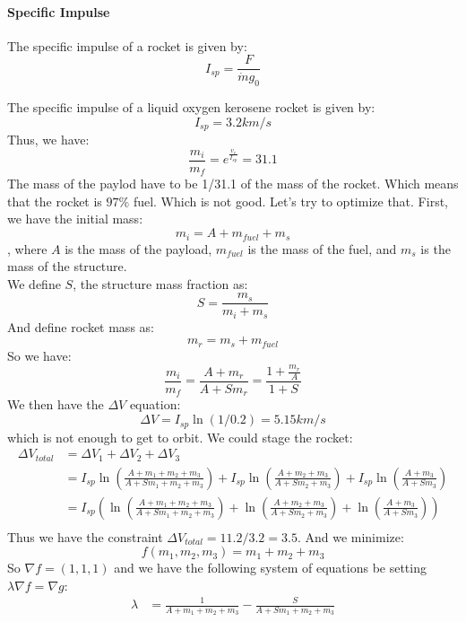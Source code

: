 \documentclass[11pt]{report}
\begin{document}
\paragraph{Specific Impulse} The specific impulse of a rocket is given by:
\begin{equation}
    I_{sp} = \frac{F}{\dot{m}g_0}
\end{equation}
\begin{example}
    The specific impulse of a liquid oxygen kerosene rocket is given by:
    $$
        I_{sp} = 3.2 km/s
    $$
    Thus, we have:
    $$
    \frac{m_i}{m_f} = e^{\frac{v_e}{I_{sp}}} = 31.1
    $$
    The mass of the paylod have to be 1/31.1 of the mass of the rocket. Which means that the rocket is $97\%$ fuel. Which is not good. Let's try to optimize that. First, we have the initial mass:
    $$
    m_i = A + m_{fuel} + m_s
    $$
    , where $A$ is the mass of the payload, $m_{fuel}$ is the mass of the fuel, and $m_s$ is the mass of the structure.\\
    We define $S$, the structure mass fraction as:
    $$
    S = \frac{m_s}{m_i + m_s}
    $$
    And define rocket mass as:
    $$
    m_r = m_s + m_{fuel}
    $$
    So we have:
    $$
        \frac{m_i}{m_f} = \frac{A + m_r}{A + Sm_r} = \frac{1 + \frac{m_r}{A}}{1 + S}
    $$
    We then have the $\Delta V$ equation:
    $$
    \Delta V = I_{sp} \ln(1/0.2) = 5.15 km/s
    $$
    which is not enough to get to orbit. We could stage the rocket:
    \begin{align*}
        \Delta V_{total} &= \Delta V_1 + \Delta V_2 + \Delta V_3 \\
        &= I_{sp} \ln \left( \frac{A + m_1 + m_2 + m_3}{A + Sm_1 + m_2 + m_3} \right) + I_{sp} \ln \left( \frac{A + m_2 + m_3}{A + Sm_2 + m_3} \right) + I_{sp} \ln \left( \frac{A + m_3}{A + Sm_3} \right) \\
        &= I_{sp} (\ln \left( \frac{A + m_1 + m_2 + m_3}{A + Sm_1 + m_2 + m_3} \right) + \ln \left( \frac{A + m_2 + m_3}{A + Sm_2 + m_3} \right) + \ln \left( \frac{A + m_3}{A + Sm_3} \right) ) \\
    \end{align*}
    Thus we have the constraint $\Delta V_{total} = 11.2 / 3.2 = 3.5$. And we minimize:
    $$
    f(m_1, m_2, m_3) = m_1 + m_2 + m_3
    $$
    So $\nabla f = (1, 1, 1)$ and we have the following system of equations be setting $\lambda \nabla f = \nabla g$:
    \begin{align*}
       \lambda &= \frac{1}{A + m_1 + m_2 + m_3} - \frac{S}{A + Sm_1 + m_2 + m_3} \\

\end{align*}
\end{example}
\end{document}
